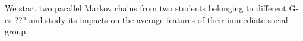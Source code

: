 \documentclass[11pt]{article}
\theoremstyle{remark}
\begin{document}







We start two parallel Markov chains from two students belonging to different {\color{red}G-es ???} and study its impacts on the average features of their immediate social group. 


\singlespacing


\end{document}
